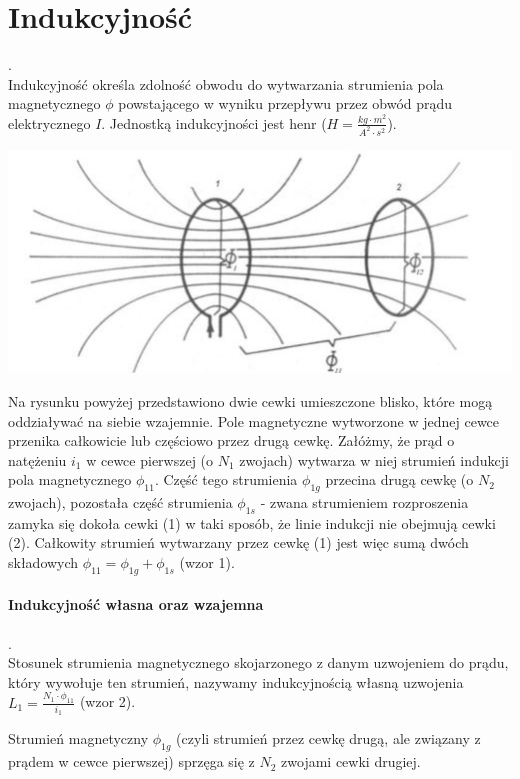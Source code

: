 \documentclass[a4paper,12pt]{scrbook} %
\begin{document}
\section{Indukcyjność}.\\
Indukcyjność określa zdolność obwodu do wytwarzania strumienia pola magnetycznego $\phi$ powstającego w wyniku przepływu przez obwód prądu elektrycznego $I$. Jednostką indukcyjności jest henr ($H = \frac{kg \cdot m^2}{A^2 \cdot s^2}$). 

\begin{center}
\includegraphics[scale=0.7]{rys1.jpg}
\end{center}

Na rysunku powyżej przedstawiono dwie cewki umieszczone blisko, które mogą oddziaływać na siebie wzajemnie. Pole magnetyczne wytworzone w jednej cewce przenika całkowicie lub częściowo przez drugą cewkę. Załóżmy, że prąd o natężeniu $i_1$ w cewce pierwszej (o $N_1$ zwojach) wytwarza w niej strumień indukcji pola magnetycznego $\phi_{11}$. Część tego strumienia $\phi_{1g}$ przecina drugą cewkę (o $N_2$ zwojach), pozostała część strumienia $\phi_{1s}$ - zwana strumieniem rozproszenia zamyka się dokoła cewki (1) w taki sposób, że linie indukcji nie obejmują cewki (2). Całkowity strumień wytwarzany przez cewkę (1) jest więc sumą dwóch składowych $ \phi_{11} = \phi_{1g} + \phi_{1s}$ (wzor 1).

\paragraph{Indukcyjność własna oraz wzajemna}.\\
Stosunek strumienia magnetycznego skojarzonego z danym uzwojeniem do prądu, który wywołuje ten strumień, nazywamy indukcyjnością własną uzwojenia $L_1 = \frac{N_1 \cdot \phi_{11}}{i_1}$ (wzor 2).

Strumień magnetyczny $\phi_{1g}$ (czyli strumień przez cewkę drugą, ale związany z prądem w cewce pierwszej) sprzęga się z $N_2$ zwojami cewki drugiej.
\end{document}
